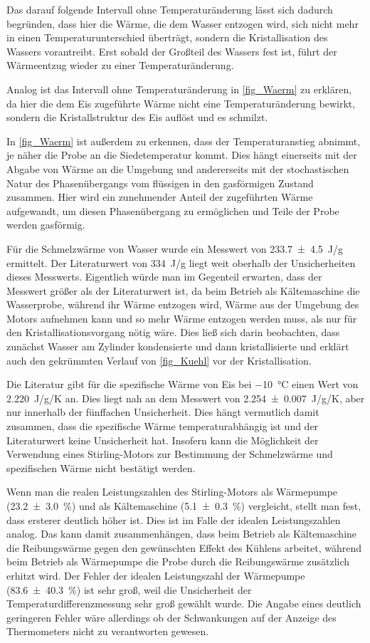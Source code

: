 \documentclass[
	a4paper,
	12pt,
	pagesize,
	ngerman
]{scrartcl}
\begin{document}
	Das darauf folgende Intervall ohne Temperaturänderung lässt sich dadurch begründen, dass hier die Wärme, die dem Wasser entzogen wird, sich nicht mehr in einen Temperaturunterschied überträgt, sondern die Kristallisation des Wassers vorantreibt.
	Erst sobald der Großteil des Wassers fest ist, führt der Wärmeentzug wieder zu einer Temperaturänderung.
	
	Analog ist das Intervall ohne Temperaturänderung in \cref{fig_Waerm} zu erklären, da hier die dem Eis zugeführte Wärme nicht eine Temperaturänderung bewirkt, sondern die Kristallstruktur des Eis auflöst und es schmilzt.
	
	In \cref{fig_Waerm} ist außerdem zu erkennen, dass der Temperaturanstieg abnimmt, je näher die Probe an die Siedetemperatur kommt.
	Dies hängt einerseits mit der Abgabe von Wärme an die Umgebung und andererseits mit der stochastischen Natur des Phasenübergangs vom flüssigen in den gasförmigen Zustand zusammen.
	Hier wird ein zunehmender Anteil der zugeführten Wärme aufgewandt, um diesen Phasenübergang zu ermöglichen und Teile der Probe werden gasförmig.
	
	Für die Schmelzwärme von Wasser wurde ein Messwert von \SI{233,7\pm 4,5}{J/g} ermittelt.
	Der Literaturwert \cite{schmelzWarm} von \SI{334}{J/g} liegt weit oberhalb der Unsicherheiten dieses Messwerts.
	Eigentlich würde man im Gegenteil erwarten, dass der Messwert größer als der Literaturwert ist, da beim Betrieb als Kältemaschine die Wasserprobe, während ihr Wärme entzogen wird, Wärme aus der Umgebung des Motors aufnehmen kann und so mehr Wärme entzogen werden muss, als nur für den Kristallisationsvorgang nötig wäre. 
	Dies ließ sich darin beobachten, dass zunächst Wasser am Zylinder kondensierte und dann kristallisierte und erklärt auch den gekrümmten Verlauf von \cref{fig_Kuehl} vor der Kristallisation.	
	
	Die Literatur \cite{spezWarm} gibt für die spezifische Wärme von Eis bei \SI{-10}{\degreeCelsius} einen Wert von \SI{2,220}{J/g/K} an.
	Dies liegt nah an dem Messwert von \SI{2,254\pm 0,007}{J/g/K}, aber nur innerhalb der fünffachen Unsicherheit.
	Dies hängt vermutlich damit zusammen, dass die spezifische Wärme temperaturabhängig ist und der Literaturwert keine Unsicherheit hat.
	Insofern kann die Möglichkeit der Verwendung eines Stirling-Motors zur Bestimmung der Schmelzwärme und spezifischen Wärme nicht bestätigt werden.
	
	Wenn man die realen Leistungszahlen des Stirling-Motors als Wärmepumpe (\SI{23,2+-3,0}{\%}) und als Kältemaschine (\SI{5,1 +- 0,3}{\%}) vergleicht, stellt man fest, dass ersterer deutlich höher ist.
	Dies ist im Falle der idealen Leistungszahlen analog.
	Das kann damit zusammenhängen, dass beim Betrieb als Kältemaschine die Reibungswärme gegen den gewünschten Effekt des Kühlens arbeitet, während beim Betrieb als Wärmepumpe die Probe durch die Reibungswärme zusätzlich erhitzt wird.
	Der Fehler der idealen Leistungszahl der Wärmepumpe (\SI{83,6+-40,3}{\%}) ist sehr groß, weil die Unsicherheit der Temperaturdifferenzmessung sehr groß gewählt wurde.
	Die Angabe eines deutlich geringeren Fehler wäre allerdings ob der Schwankungen auf der Anzeige des Thermometers nicht zu verantworten gewesen.
	
\end{document}

